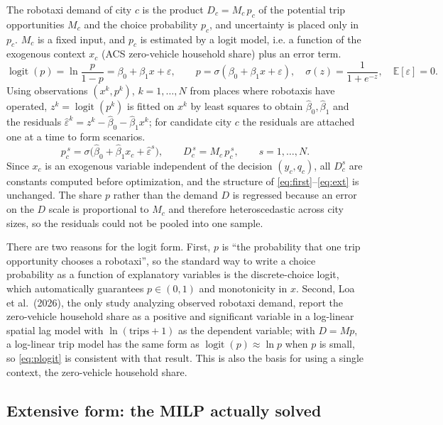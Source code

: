 \documentclass[10pt,a4paper]{article}
\DeclareMathOperator{\logit}{logit}
\begin{document}
The robotaxi demand of city $c$ is the product $D_c=M_c\,p_c$ of the potential trip opportunities $M_c$ and the choice probability $p_c$, and uncertainty is placed only in $p_c$. $M_c$ is a fixed input, and $p_c$ is estimated by a logit model, i.e. a function of the exogenous context $x_c$ (ACS zero-vehicle household share) plus an error term.
\begin{equation}\label{eq:plogit}
\logit(p)=\ln\frac{p}{1-p}=\beta_0+\beta_1x+\varepsilon,\qquad
p=\sigma(\beta_0+\beta_1x+\varepsilon),\quad \sigma(z)=\frac{1}{1+e^{-z}},\quad \mathbb E[\varepsilon]=0 .
\end{equation}
Using observations $(x^k,p^k)$, $k=1,\dots,N$ from places where robotaxis have operated, $z^k=\logit(p^k)$ is fitted on $x^k$ by least squares to obtain $\hat\beta_0,\hat\beta_1$ and the residuals $\hat\varepsilon^k=z^k-\hat\beta_0-\hat\beta_1x^k$; for candidate city $c$ the residuals are attached one at a time to form scenarios.
\begin{equation}\label{eq:pscen}
p_c^{\,s}=\sigma\big(\hat\beta_0+\hat\beta_1x_c+\hat\varepsilon^{s}\big),\qquad D_c^{\,s}=M_c\,p_c^{\,s},\qquad s=1,\dots,N.
\end{equation}
Since $x_c$ is an exogenous variable independent of the decision $(y_c,q_c)$, all $D_c^s$ are constants computed before optimization, and the structure of \eqref{eq:first}--\eqref{eq:ext} is unchanged. The share $p$ rather than the demand $D$ is regressed because an error on the $D$ scale is proportional to $M_c$ and therefore heteroscedastic across city sizes, so the residuals could not be pooled into one sample.

There are two reasons for the logit form. First, $p$ is ``the probability that one trip opportunity chooses a robotaxi'', so the standard way to write a choice probability as a function of explanatory variables is the discrete-choice logit, which automatically guarantees $p\in(0,1)$ and monotonicity in $x$. Second, Loa et al.\ (2026), the only study analyzing observed robotaxi demand, report the zero-vehicle household share as a positive and significant variable in a log-linear spatial lag model with $\ln(\text{trips}+1)$ as the dependent variable; with $D=Mp$, a log-linear trip model has the same form as $\logit(p)\approx\ln p$ when $p$ is small, so \eqref{eq:plogit} is consistent with that result. This is also the basis for using a single context, the zero-vehicle household share.


\subsection{Extensive form: the MILP actually solved}
\end{document}
